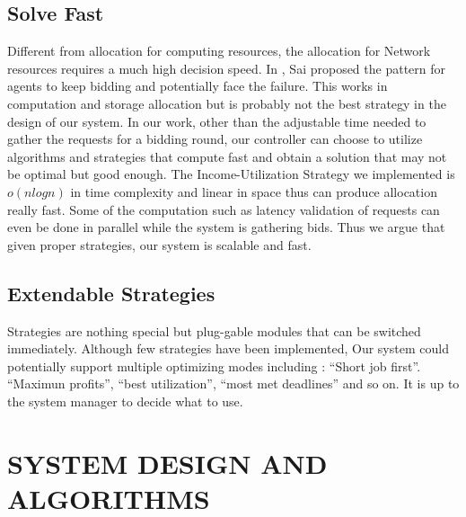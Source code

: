 \documentclass[a4paper,11pt,twocolumn]{article}
\begin{document}
\subsection{Solve Fast}
Different from allocation for computing resources, the allocation for Network resources requires a much high 
decision speed. In \cite{Sai}, Sai proposed the pattern for agents to keep bidding and potentially face the failure. This works in computation and storage allocation but is
probably not the best strategy in the design of our system. 
In our work, other than the adjustable time needed to gather the requests for a bidding round, our controller can choose to utilize algorithms and strategies that compute fast and obtain a solution that may not be optimal but good enough. The Income-Utilization Strategy we implemented is  $o(nlogn)$ in time complexity and linear in space thus can produce allocation really fast. Some of the computation such as latency validation of requests can even be done in parallel while the system is gathering bids. Thus we argue that given proper strategies, our system is scalable and fast.



\subsection{Extendable Strategies}
Strategies are nothing special but plug-gable modules that can be switched immediately. Although few strategies have been implemented,  
Our system could potentially support multiple optimizing modes including : ``Short job first''. ``Maximun profits'', ``best utilization'',
``most met deadlines'' and so on. It is up to the system manager to decide what to use.


\section{SYSTEM DESIGN AND ALGORITHMS}
\end{document}
